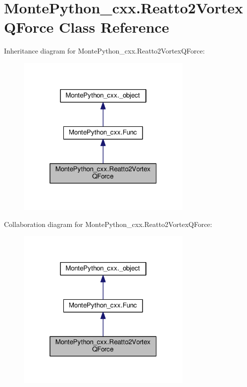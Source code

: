 \hypertarget{classMontePython__cxx_1_1Reatto2VortexQForce}{}\section{Monte\+Python\+\_\+cxx.\+Reatto2\+Vortex\+Q\+Force Class Reference}
\label{classMontePython__cxx_1_1Reatto2VortexQForce}


Inheritance diagram for Monte\+Python\+\_\+cxx.\+Reatto2\+Vortex\+Q\+Force\+:
\nopagebreak
\begin{figure}[H]
\begin{center}
\leavevmode
\includegraphics[width=241pt]{classMontePython__cxx_1_1Reatto2VortexQForce__inherit__graph}
\end{center}
\end{figure}


Collaboration diagram for Monte\+Python\+\_\+cxx.\+Reatto2\+Vortex\+Q\+Force\+:
\nopagebreak
\begin{figure}[H]
\begin{center}
\leavevmode
\includegraphics[width=241pt]{classMontePython__cxx_1_1Reatto2VortexQForce__coll__graph}
\end{center}
\end{figure}
